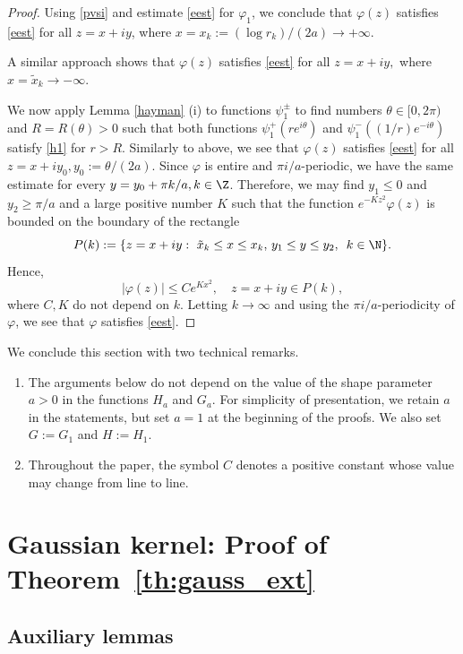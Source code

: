 \documentclass[12pt]{amsart}
\numberwithin{equation}{section}
\theoremstyle{plain}
\theoremstyle{definition}
\begin{document}
\begin{proof}
Using \eqref{pvsi} and estimate  \eqref{eest} for $\varphi_1$, we conclude that  $\varphi(z)$ satisfies \eqref{eest}  for all $z = x + i y$, where $x=x_k:=(\log r_k)/(2a) \to+\infty$.

A similar approach shows that $\varphi(z)$ satisfies \eqref{eest} for all $z=x+iy, $ where $x=\tilde x_k\to-\infty.$

 
We now apply Lemma \ref{hayman} (i) to functions $\psi^{\pm}_1$ to find   numbers $ \theta\in [0,2\pi)$ and $R=R(\theta)>0$ such that both functions $\psi^{+}_1(re^{i\theta})$ and
$\psi^{-}_1((1/r)e^{-i\theta})$
satisfy \eqref{h1} for $r>R$. Similarly to above, we see that $\varphi(z)$ satisfies \eqref{eest}  for all $z=x+iy_0, y_0:=\theta/(2a)$.
Since $\varphi$ is entire and $\pi i/a$-periodic, we have the same estimate for every $y = y_0+\pi  k/a, k\in\Z$.
Therefore, we may find $y_1\leq0$ and $y_2\geq \pi/a$ and a large positive number $K$ such that the function  $e^{-K z^2}\varphi(z)$ is bounded on the boundary of the rectangle $$P(k):=\{z=x+iy:\,\, \tilde x_k\leq x\leq x_k,\, y_1\leq y\leq y_2,\,\,\, k\in\N\}.$$
Hence,
$$|\varphi(z)|\leq Ce^{K x^2},\quad z=x+iy\in P(k),$$ where $C,K$ do not depend on $k.$ Letting  $k\to\infty$ and using the $\pi i/a$-periodicity of $\varphi$, we see that $\varphi$  satisfies
\eqref{eest}. 
\end{proof}
 
 We conclude this section with two technical remarks.
\begin{enumerate}
    \item[(1)] The arguments below do not depend on the value of the shape parameter $a > 0$ in the functions $H_a$ and $G_a$. For simplicity of presentation, we retain $a$ in the  statements, but set $a=1$ at the beginning of the proofs. We also set $G:=G_1$ and $H:=H_1$. 
    \item[(2)]Throughout the paper, the symbol $C$ denotes a positive constant whose value may change from line to line. 
\end{enumerate}


\section{Gaussian kernel: Proof of Theorem~\ref{th:gauss_ext}}

\subsection{Auxiliary lemmas}
\end{document}
